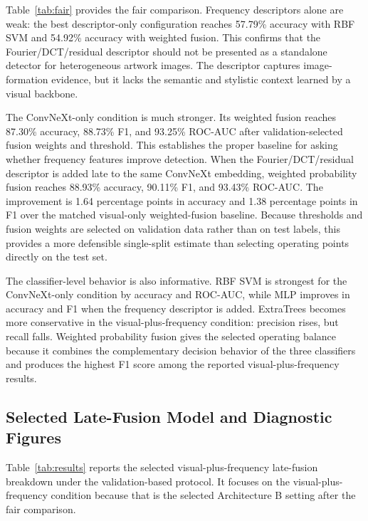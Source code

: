 ﻿\documentclass[10pt,twocolumn]{article}
\begin{document}
Table~\ref{tab:fair} provides the fair comparison. Frequency descriptors alone are weak: the best descriptor-only configuration reaches 57.79\% accuracy with RBF SVM and 54.92\% accuracy with weighted fusion. This confirms that the Fourier/DCT/residual descriptor should not be presented as a standalone detector for heterogeneous artwork images. The descriptor captures image-formation evidence, but it lacks the semantic and stylistic context learned by a visual backbone.

The ConvNeXt-only condition is much stronger. Its weighted fusion reaches 87.30\% accuracy, 88.73\% F1, and 93.25\% ROC-AUC after validation-selected fusion weights and threshold. This establishes the proper baseline for asking whether frequency features improve detection. When the Fourier/DCT/residual descriptor is added late to the same ConvNeXt embedding, weighted probability fusion reaches 88.93\% accuracy, 90.11\% F1, and 93.43\% ROC-AUC. The improvement is 1.64 percentage points in accuracy and 1.38 percentage points in F1 over the matched visual-only weighted-fusion baseline. Because thresholds and fusion weights are selected on validation data rather than on test labels, this provides a more defensible single-split estimate than selecting operating points directly on the test set.

The classifier-level behavior is also informative. RBF SVM is strongest for the ConvNeXt-only condition by accuracy and ROC-AUC, while MLP improves in accuracy and F1 when the frequency descriptor is added. ExtraTrees becomes more conservative in the visual-plus-frequency condition: precision rises, but recall falls. Weighted probability fusion gives the selected operating balance because it combines the complementary decision behavior of the three classifiers and produces the highest F1 score among the reported visual-plus-frequency results.

\subsection{Selected Late-Fusion Model and Diagnostic Figures}
Table~\ref{tab:results} reports the selected visual-plus-frequency late-fusion breakdown under the validation-based protocol. It focuses on the visual-plus-frequency condition because that is the selected Architecture B setting after the fair comparison.
\end{document}

